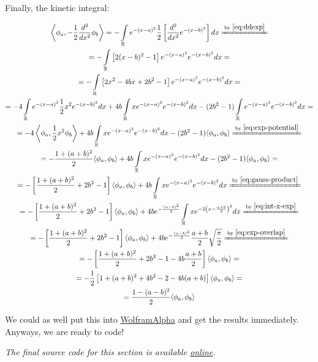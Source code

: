\documentclass{article}
\newcommand{\githubrepo}{https://github.com/lisyarus/chembook}
\newcommand{\codeonline}[1]{\textit{The final source code for this section is available \href{\githubrepo/blob/master/code/#1}{online}.}}
\newcommand{\equalby}[1]{\xlongequal{\text{by }\eqref{#1}}}
\newcommand{\intR}{\int\limits_\mathbb R}
\begin{document}
Finally, the kinetic integral:

\begin{equation} \label{eq:exp-kinetic}
\begin{gathered}
\left\langle \phi_a , -\frac{1}{2} \frac{d^2}{dx^2} \phi_b \right\rangle = -\intR e^{-(x-a)^2} \frac{1}{2} \left[ \frac{d^2}{dx^2} e^{-(x-b)^2} \right] dx \equalby{eq:ddexp} \\
= -\intR \left[ 2(x-b)^2 -1 \right] e^{-(x-a)^2} e^{-(x-b)^2} dx = \\
= -\intR \left[ 2x^2 - 4bx + 2b^2-1 \right] e^{-(x-a)^2} e^{-(x-b)^2} dx = \\
= - 4 \intR e^{-(x-a)^2} \frac{1}{2} x^2 e^{-(x-b)^2} dx + 4b \intR x e^{-(x-a)^2} e^{-(x-b)^2} dx - (2b^2-1) \intR e^{-(x-a)^2} e^{-(x-b)^2} dx = \\
= - 4 \left\langle \phi_a, \frac{1}{2} x^2 \phi_b \right\rangle + 4b \intR x e^{-(x-a)^2} e^{-(x-b)^2} dx - (2b^2-1) \langle \phi_a, \phi_b \rangle \equalby{eq:exp-potential} \\
= - \frac{1+(a+b)^2}{2} \langle \phi_a, \phi_b \rangle + 4b \intR x e^{-(x-a)^2} e^{-(x-b)^2} dx - (2b^2-1) \langle \phi_a, \phi_b \rangle = \\
= - \left[\frac{1+(a+b)^2}{2} + 2b^2 - 1\right] \langle \phi_a, \phi_b \rangle + 4b \intR x e^{-(x-a)^2} e^{-(x-b)^2} dx \equalby{eq:gauss-product} \\
= - \left[\frac{1+(a+b)^2}{2} + 2b^2 - 1\right] \langle \phi_a, \phi_b \rangle + 4b e^{-\frac{(a-b)^2}{2}} \intR x e^{-2\left(x-\frac{a+b}{2}\right)^2} dx \equalby{eq:int-x-exp} \\
= - \left[\frac{1+(a+b)^2}{2} + 2b^2 - 1\right] \langle \phi_a, \phi_b \rangle + 4b e^{-\frac{(a-b)^2}{2}} \frac{a+b}{2} \sqrt\frac{\pi}{2} \equalby{eq:exp-overlap} \\
= - \left[\frac{1+(a+b)^2}{2} + 2b^2 - 1 -4b\frac{a+b}{2}\right] \langle \phi_a, \phi_b \rangle = \\
= - \frac{1}{2} \left[ 1 + (a+b)^2 + 4b^2 - 2 - 4b(a+b)\right] \langle \phi_a, \phi_b \rangle = \\
= \frac{1 - (a-b)^2}{2} \langle \phi_a, \phi_b \rangle 
\end{gathered}
\end{equation}

We could as well put this into \href{https://www.wolframalpha.com/}{WolframAlpha} and get the results immediately. Anyways, we are ready to code!

\codeonline{harmonic.py}
\end{document}
